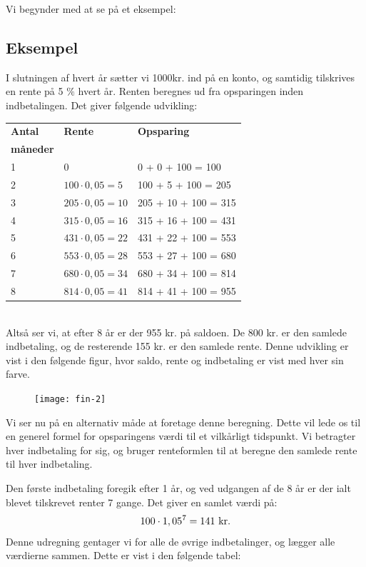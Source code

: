 \documentclass[12pt,oneside,a4paper]{article}
\begin{document}
Vi begynder med at se på et eksempel:
\begin{tcolorbox}
\subsection*{Eksempel}
I slutningen af hvert år sætter vi 1000kr. ind på en konto, og samtidig
tilskrives en rente på 5 $\%$ hvert år. Renten beregnes ud fra
opsparingen inden indbetalingen.  Det giver følgende udvikling:
\\

\begin{tabular}{|l|l|l|}
    \hline
    \textbf{Antal} & \textbf{Rente} & \textbf{Opsparing} \\
    \textbf{måneder} &  & \\
    \hline
    1 & 0 & 0 + 0 + 100 = 100 \\
    \hline
    2 & $100\cdot 0,05 = 5$ & 100 + 5 + 100 = 205 \\
    \hline
    3 & $205\cdot 0,05 = 10$ & 205 + 10 + 100 = 315 \\
    \hline
    4 & $315\cdot 0,05 = 16$ & 315 + 16 + 100 = 431 \\
    \hline
    5 & $431\cdot 0,05 = 22$ & 431 + 22 + 100 = 553 \\
    \hline
    6 & $553\cdot 0,05 = 28$ & 553 + 27 + 100 = 680 \\
    \hline
    7 & $680\cdot 0,05 = 34$ & 680 + 34 + 100 = 814 \\
    \hline
    8 & $814\cdot 0,05 = 41$ & 814 + 41 + 100 = 955 \\
    \hline
\end{tabular}
\\

Altså ser vi, at efter 8 år er der 955 kr. på saldoen. De 800 kr. er den
samlede indbetaling, og de resterende 155 kr. er den samlede rente.
Denne udvikling er vist i den følgende figur, hvor saldo, rente og indbetaling er vist med hver sin farve.
\begin{figure}[H]
    \centering
    \texttt{[image: fin-2]}
\end{figure}
\end{tcolorbox}

Vi ser nu på en alternativ måde at foretage denne beregning. Dette vil lede os
til en generel formel for opsparingens værdi til et vilkårligt tidspunkt. Vi
betragter hver indbetaling for sig, og bruger renteformlen til at beregne den
samlede rente til hver indbetaling.

Den første indbetaling foregik efter 1 år, og ved udgangen af de 8 år
er der ialt blevet tilskrevet renter 7 gange.  Det giver en samlet værdi på:
\[
    100\cdot 1,05^7 = 141 {\,\,\rm kr.}
\]
Denne udregning gentager vi for alle de øvrige indbetalinger, og lægger alle
værdierne sammen.  Dette er vist i den følgende tabel:
\\
\end{document}

